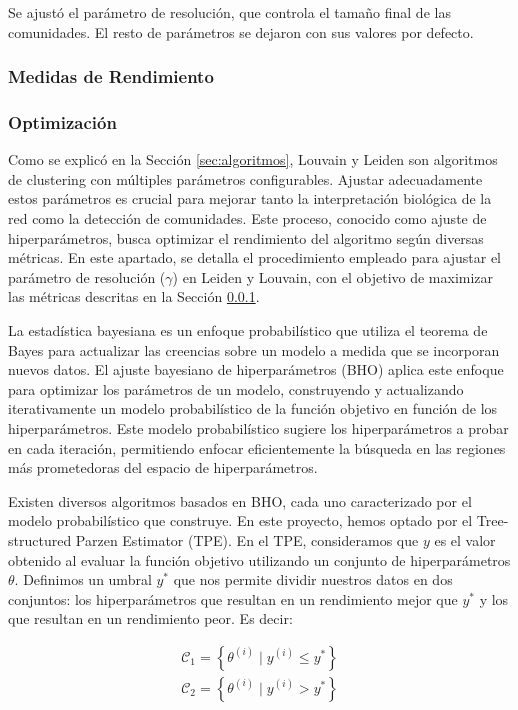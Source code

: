 \noindent Se ajustó el parámetro de resolución, que controla el tamaño final de las comunidades. El resto de parámetros se dejaron con sus valores por defecto.

\subsubsection{Medidas de Rendimiento}
\label{sec:metricas}

\subsubsection{Optimización}

Como se explicó en la Sección \ref{sec:algoritmos}, Louvain y Leiden son algoritmos de clustering con múltiples parámetros configurables. Ajustar adecuadamente estos parámetros es crucial para mejorar tanto la interpretación biológica de la red como la detección de comunidades. Este proceso, conocido como ajuste de hiperparámetros, busca optimizar el rendimiento del algoritmo según diversas métricas. En este apartado, se detalla el procedimiento empleado para ajustar el parámetro de resolución (\(\gamma\)) en Leiden y Louvain, con el objetivo de maximizar las métricas descritas en la Sección \ref{sec:metricas}.

La estadística bayesiana es un enfoque probabilístico que utiliza el teorema de Bayes para actualizar las creencias sobre un modelo a medida que se incorporan nuevos datos. El ajuste bayesiano de hiperparámetros (BHO) aplica este enfoque para optimizar los parámetros de un modelo, construyendo y actualizando iterativamente un modelo probabilístico de la función objetivo en función de los hiperparámetros. Este modelo probabilístico sugiere los hiperparámetros a probar en cada iteración, permitiendo enfocar eficientemente la búsqueda en las regiones más prometedoras del espacio de hiperparámetros.

Existen diversos algoritmos basados en BHO, cada uno caracterizado por el modelo probabilístico que construye. En este proyecto, hemos optado por el Tree-structured Parzen Estimator (TPE). En el TPE, consideramos que \( y \) es el valor obtenido al evaluar la función objetivo utilizando un conjunto de hiperparámetros \( \theta \). Definimos un umbral \( y^* \) que nos permite dividir nuestros datos en dos conjuntos: los hiperparámetros que resultan en un rendimiento mejor que \( y^* \) y los que resultan en un rendimiento peor. Es decir:

\begin{equation}
	\begin{aligned}
		\mathcal{C}_1 = \left\{ \theta^{(i)} \mid y^{(i)} \leq y^* \right\} \\
		\mathcal{C}_2 = \left\{ \theta^{(i)} \mid y^{(i)} > y^* \right\}
	\end{aligned}
\end{equation}

